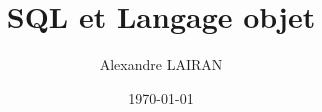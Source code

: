 \documentclass{beamer}
\title{SQL et Langage objet}
\author{Alexandre LAIRAN}
\date{\today}
\begin{document}
\begin{frame}
\titlepage
\end{frame}







\end{document}
